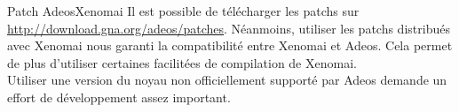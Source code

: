 % 

\begin{frame}[fragile=singleslide]{Patch Adeos}{Xenomai}
  Il    est     possible    de    télécharger     les    patchs    sur
  \url{http://download.gna.org/adeos/patches}. Néanmoins, utiliser les
  patchs distribués  avec Xenomai nous garanti  la compatibilité entre
  Xenomai  et  Adeos.   Cela   permet  de  plus  d'utiliser  certaines
  facilitées de compilation de Xenomai.
  \\[2ex]
  Utiliser une version du  noyau non officiellement supporté par Adeos
  demande un effort de développement assez important.


\end{frame}

